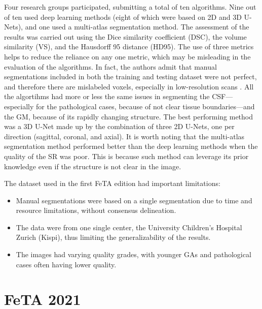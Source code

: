 Four research groups participated, submitting a total of ten algorithms. Nine out of ten used deep learning methods (eight of which were based on 2D and 3D U-Nets), and one used a multi-atlas segmentation method. The assessment of the results was carried out using the Dice similarity coefficient (DSC), the volume similarity (VS), and the Hausdorff 95 distance (HD95). The use of three metrics helps to reduce the reliance on any one metric, which may be misleading in the evaluation of the algorithms. In fact, the authors admit that manual segmentations included in both the training and testing dataset were not perfect, and therefore there are mislabeled voxels, especially in low-resolution scans \cite{FeTA2021_review}. All the algortihms had more or less the same issues in segmenting the CSF---especially for the pathological cases, because of not clear tissue boundaries---and the GM, because of its rapidly changing structure. The best performing method was a 3D U-Net made up by the combination of three 2D U-Nets, one per direction (sagittal, coronal, and axial). It is worth noting that the multi-atlas segmentation method performed better than the deep learning methods when the quality of the SR was poor. This is because such method can leverage its prior knowledge even if the structure is not clear in the image.

The dataset used in the first FeTA edition had important limitations:
\begin{itemize}
    \item Manual segmentations were based on a single segmentation due to time and resource limitations, without consensus delineation.
    \item The data were from one single center, the University Children's Hospital Zurich (Kispi), thus limiting the generalizability of the results.
    \item The images had varying quality grades, with younger GAs and pathological cases often having lower quality.
\end{itemize}

\section{FeTA 2021}


